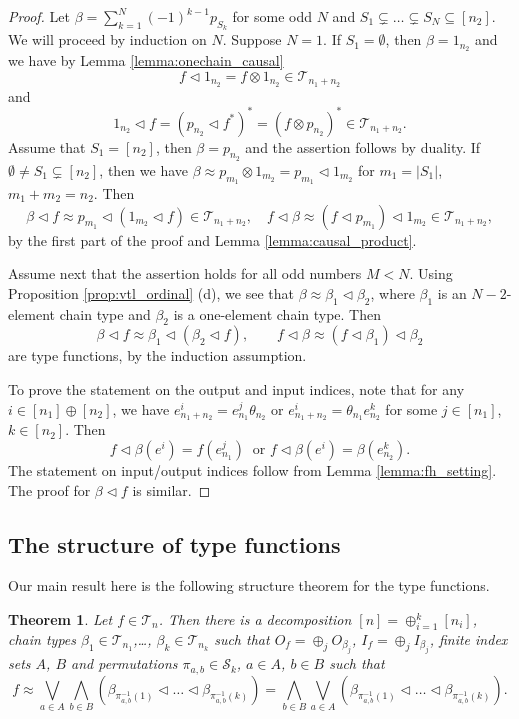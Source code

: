 \documentclass[12pt]{article}
\newtheorem{theorem}{Theorem}
\theoremstyle{definition}
\theoremstyle{remark}
\def\Te{\mathcal T}
\def\permut{\mathscr{S}}
\def\vtl{\vartriangleleft}
\begin{document}
\begin{proof} Let  $\beta=\sum_{k=1}^{N}(-1)^{k-1}p_{S_k}$
for some odd $N$ and $S_1\subsetneq \dots \subsetneq S_N\subseteq [n_2]$. We will proceed
by induction on $N$. Suppose $N=1$. If $S_1=\emptyset$,
then $\beta=1_{n_2}$ and we have by Lemma \ref{lemma:onechain_causal}
\[
f\vtl 1_{n_2}=f\otimes 1_{n_2}\in \Te_{n_1+n_2}
\]
and
\[
1_{n_2}\vtl f=(p_{n_2}\vtl f^*)^*=(f\otimes p_{n_2})^*\in \Te_{n_1+n_2}.
\]
Assume that  $S_1=[n_2]$, then $\beta=p_{n_2}$ and the assertion follows by duality. 
If $\emptyset\ne S_1\subsetneq [n_2]$, then we have $\beta\approx p_{m_1}\otimes
1_{m_2}=p_{m_1}\vtl 1_{m_2}$ for $m_1=|S_1|$, $m_1+m_2=n_2$. Then 
\[
\beta\vtl f\approx p_{m_1}\vtl (1_{m_2}\vtl f)\in \Te_{n_1+n_2},\quad f\vtl \beta\approx (f\vtl p_{m_1})\vtl 1_{m_2} \in
\Te_{n_1+n_2},
\]
by the first part of the proof and Lemma \ref{lemma:causal_product}.

Assume next that the assertion holds for all odd numbers $M<N$. Using Proposition
\ref{prop:vtl_ordinal} (d), we see that $\beta\approx \beta_1\vtl\beta_2$, where $\beta_1$ is
an $N-2$-element chain type and $\beta_2$ is a one-element chain  type. Then
\[
\beta\vtl f\approx \beta_1\vtl(\beta_2\vtl f),\qquad f\vtl\beta\approx (f\vtl\beta_1)\vtl\beta_2
\]
are type functions, by the induction assumption. 


To prove the statement on the output and input indices, note that for any $i\in [n_1]\oplus [n_2]$, we have  $e^i_{n_1+n_2}=e^j_{n_1}\theta_{n_2}$ or
$e^i_{n_1+n_2}=\theta_{n_1}e^k_{n_2}$
for some $j\in [n_1]$, $k\in [n_2]$. Then   
\[
f\vtl\beta(e^i)=f(e^j_{n_1})\ \text{ or } f\vtl \beta(e^i)=\beta(e^k_{n_2}).
\]
The statement on input/output indices  follow from Lemma \ref{lemma:fh_setting}. The proof
for $\beta\vtl f$ is similar. 

\end{proof}


\subsection{The structure of type functions}

Our main result here is the  following structure theorem for the type functions.


\begin{theorem}\label{thm:structure}
Let  $f\in \Te_n$. Then there is  a decomposition
$[n]=\oplus_{i=1}^k[n_i]$, chain types 
$\beta_1\in \Te_{n_1}$,\dots, $\beta_k\in
\Te_{n_k}$ such that $O_f=\oplus_j O_{\beta_j}$, $I_f=\oplus_j I_{\beta_j}$, finite index sets $A$, $B$ and permutations $\pi_{a,b}\in
\permut_k$, $a\in A$, $b\in B$ such that 
\[
f\approx \bigvee_{a\in A}\bigwedge_{b\in B} (\beta_{\pi^{-1}_{a,b}(1)}\vtl \dots \vtl
\beta_{\pi^{-1}_{a,b}(k)})=\bigwedge_{b\in B}\bigvee_{a\in A}(\beta_{\pi^{-1}_{a,b}(1)}\vtl \dots \vtl
\beta_{\pi^{-1}_{a,b}(k)}).
\]
%
\end{theorem}
\end{document}
